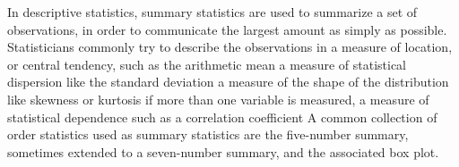 In descriptive statistics, summary statistics are used to summarize a set of observations, in order to communicate the largest amount as simply as possible. Statisticians commonly try to describe the observations in
a measure of location, or central tendency, such as the arithmetic mean
a measure of statistical dispersion like the standard deviation
a measure of the shape of the distribution like skewness or kurtosis
if more than one variable is measured, a measure of statistical dependence such as a correlation coefficient
A common collection of order statistics used as summary statistics are the five-number summary, sometimes extended to a seven-number summary, and the associated box plot.
